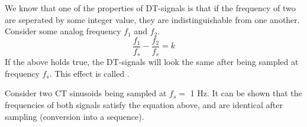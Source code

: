 We know that one of the properties of DT-signals is that if the frequency of two are seperated by some integer value, they are indistinguishable from one another. Consider some analog frequency $f_1$ and $f_2$.
\[	\dfrac{f_1}{f_s} - \dfrac{f_2}{f_s}	= k\]
If the above holds true, the DT-signals will look the same after being sampled at frequency $f_s$. This effect is called .

Consider two CT sinusoids being sampled at $f_s =$ 1 Hz. It can be shown that the frequencies of both signals satisfy the equation above, and are identical after sampling (conversion into a sequence). 

